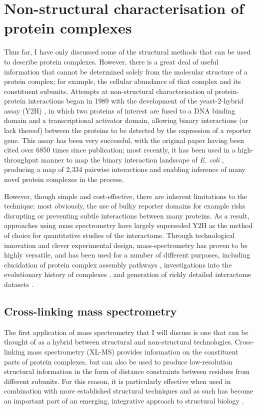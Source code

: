 \documentclass[a4paper,11pt,twoside,openright]{scrbook}
\begin{document}
\section{Non-structural characterisation of protein complexes}
Thus far, I have only discussed some of the structural methods that can be used to describe protein complexes. However, there is a great deal of useful information that cannot be determined solely from the molecular structure of a protein complex; for example, the cellular abundance of that complex and its constituent subunits. Attempts at non-structural characterisation of protein-protein interactions began in 1989 with the development of the yeast-2-hybrid assay (Y2H) \cite{Fields1989}, in which two proteins of interest are fused to a DNA binding domain and a transcriptional activator domain, allowing binary interactions (or lack thereof) between the proteins to be detected by the expression of a reporter gene. This assay has been very successful, with the original paper having been cited over 6850 times since publication; most recently, it has been used in a high-throughput manner to map the binary interaction landscape of \textit{E. coli} \cite{Rajagopala2014}, producing a map of 2,334 pairwise interactions and enabling inference of many novel protein complexes in the process.

However, though simple and cost-effective, there are inherent limitations to the technique: most obviously, the use of bulky reporter domains for example risks disrupting or preventing subtle interactions between many proteins. As a result, approaches using mass spectrometry have largely superseded Y2H as the method of choice for quantitative studies of the interactome. Through technological innovation and clever experimental design, mass-spectrometry has proven to be highly versatile, and has been used for a number of different purposes, including elucidation of protein complex assembly pathways \cite{Levy2008a,Marsh2013}, investigations into the evolutionary history of complexes \cite{Wan2015}, and generation of richly detailed interactome datasets \cite{Hein2015}.

\subsection{Cross-linking mass spectrometry}
The first application of mass spectrometry that I will discuss is one that can be thought of as a hybrid between structural and non-structural technologies. Cross-linking mass spectrometry (XL-MS) provides information on the constituent parts of protein complexes, but can also be used to produce low-resolution structural information in the form of distance constraints between residues from different subunits. For this reason, it is particularly effective when used in combination with more established structural techniques and as such has become an important part of an emerging, integrative approach to structural biology \cite{Stengel2012,Ward2013}.
\end{document}

